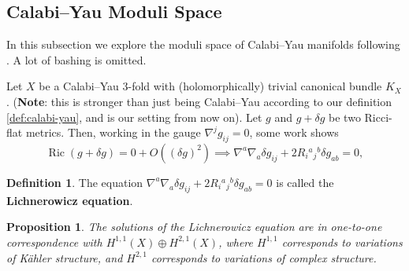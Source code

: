 \documentclass{report}
\theoremstyle{plain}
\newtheorem{proposition}[theorem]{Proposition}
\theoremstyle{definition}
\newtheorem{definition}[theorem]{Definition}
\theoremstyle{remark}
\DeclareMathOperator{\Ric}{Ric}
\begin{document}
\subsection{Calabi--Yau Moduli Space}

In this subsection we explore the moduli space of Calabi--Yau
manifolds following \cite{Candelas1991}. A lot of bashing is omitted.

Let $X$ be a Calabi--Yau $3$-fold with (holomorphically) trivial
canonical bundle $K_X$. ({\bf Note}: this is stronger than just being
Calabi--Yau according to our definition \ref{def:calabi-yau}, and is
our setting from now on). Let $g$ and $g + \delta g$ be two Ricci-flat
metrics. Then, working in the gauge $\nabla^j g_{ij} = 0$, some work
shows
\[ \Ric(g + \delta g) = 0 + O((\delta g)^2) \implies \nabla^a\nabla_a\delta g_{ij} + 2R_i{}^a{}_j{}^b \delta g_{ab} = 0, \]

\begin{definition}
  The equation $\nabla^a\nabla_a\delta g_{ij} + 2R_i{}^a{}_j{}^b
  \delta g_{ab} = 0$ is called the {\bf Lichnerowicz equation}.
\end{definition}

\begin{proposition}
  The solutions of the Lichnerowicz equation are in one-to-one
  correspondence with $H^{1,1}(X) \oplus H^{2,1}(X)$, where $H^{1,1}$
  corresponds to variations of K\"ahler structure, and $H^{2,1}$
  corresponds to variations of complex structure.
\end{proposition}
\end{document}
